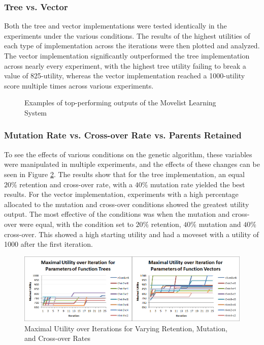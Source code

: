 \documentclass{acm_proc_article-sp}
\begin{document}
    \subsubsection{Tree vs. Vector}

Both the tree and vector implementations were tested identically in the experiments under the various conditions. The results of the highest utilities of each type of implementation across the iterations were then plotted and analyzed. The vector implementation significantly outperformed the tree implementation across nearly every experiment, with the highest tree utility failing to break a value of 825-utility, whereas the vector implementation reached a 1000-utility score multiple times across various experiments. 

\begin{figure}[h]
    \centering
    
    \caption{Examples of top-performing outputs of the Movelist Learning System}
    \label{example-results}
\end{figure}

    \subsubsection{Mutation Rate vs. Cross-over Rate vs. Parents Retained}

To see the effects of various conditions on the genetic algorithm, these variables were manipulated in multiple experiments, and the effects of these changes can be seen in Figure \ref{utility_experiments}. The results show that for the tree implementation, an equal $20\%$ retention and cross-over rate, with a $40\%$ mutation rate yielded the best results. For the vector implementation, experiments with a high percentage allocated to the mutation and cross-over conditions showed the greatest utility output. The most effective of the conditions was when the mutation and cross-over were equal, with the condition set to $20\%$ retention, $40\%$ mutation and $40\%$ cross-over. This showed a high starting utility and had a moveset with a utility of 1000 after the first iteration.


\begin{figure}[t]
    \centering
    \includegraphics[width=\textwidth,keepaspectratio]{./images/gen-mureco-comparison.png}
    \caption{Maximal Utility over Iterations for Varying Retention, Mutation, and Cross-over Rates}
    \label{utility_experiments}
\end{figure}
\end{document}
